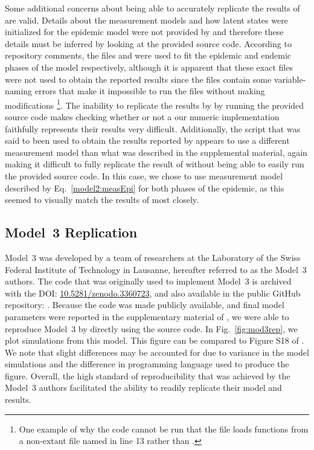Some additional concerns about being able to accurately replicate the results of \cite{lee20} are valid.
Details about the measurement models and how latent states were initialized for the epidemic model were not provided by \citet{lee20sup} and therefore these details must be inferred by looking at the provided source code.
According to repository comments, the files  and  were used to fit the epidemic and endemic phases of the model respectively, although it is apparent that these exact files were not used to obtain the reported results since the files contain some variable-naming errors that make it impossible to run the files without making modifications \footnote{One example of why the code cannot be run that the file loads functions from a non-extant file named  in line 13 rather than .}.
The inability to replicate the results by \citet{lee20} by running the provided source code makes checking whether or not a our numeric implementation faithfully represents their results very difficult.
Additionally, the script that was said to been used to obtain the results reported by \cite{lee20} appears to use a different measurement model than what was described in the supplemental material, again making it difficult to fully replicate the result of \cite{lee20} without being able to easily run the provided source code.
In this case, we chose to use measurement model described by Eq.~\ref{model2:measEpi} for both phases of the epidemic, as this seemed to visually match the results of \cite{lee20} most closely.

\subsection{Model~3 Replication}

Model~3 was developed by a team of researchers at the Laboratory of the Swiss Federal Institute of Technology in Lausanne, hereafter referred to as the Model~3 authors.
The code that was originally used to implement Model~3 is archived with the DOI: \url{10.5281/zenodo.3360723}, and also available in the public GitHub repository: .
Because the code was made publicly available, and final model parameters were reported in the supplementary material of \cite{lee20}, we were able to reproduce Model~3 by directly using the source code.
In Fig.~\ref{fig:mod3rep}, we plot simulations from this model.
This figure can be compared to Figure S18 of \cite{lee20}.
We note that slight differences may be accounted for due to variance in the model simulations and the difference in programming language used to produce the figure.
Overall, the high standard of reproducibility that was achieved by the Model~3 authors facilitated the ability to readily replicate their model and results.




